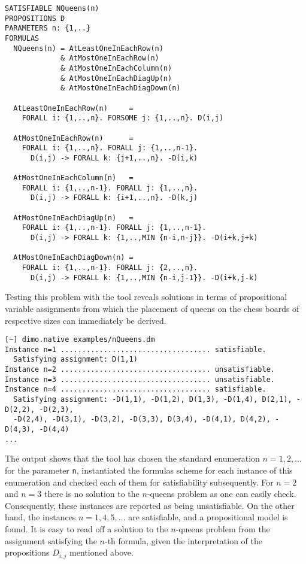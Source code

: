 \documentclass[twoside]{article}
\begin{document}
\begin{verbatim}
SATISFIABLE NQueens(n)
PROPOSITIONS D
PARAMETERS n: {1,..}
FORMULAS 
  NQueens(n) = AtLeastOneInEachRow(n)
             & AtMostOneInEachRow(n)
             & AtMostOneInEachColumn(n)
             & AtMostOneInEachDiagUp(n)
             & AtMostOneInEachDiagDown(n)
	         
  AtLeastOneInEachRow(n)     = 
    FORALL i: {1,..,n}. FORSOME j: {1,..,n}. D(i,j)
    
  AtMostOneInEachRow(n)      = 
    FORALL i: {1,..,n}. FORALL j: {1,..,n-1}. 
      D(i,j) -> FORALL k: {j+1,..,n}. -D(i,k)
    
  AtMostOneInEachColumn(n)   = 
    FORALL i: {1,..,n-1}. FORALL j: {1,..,n}. 
      D(i,j) -> FORALL k: {i+1,..,n}. -D(k,j)
    
  AtMostOneInEachDiagUp(n)   = 
    FORALL i: {1,..,n-1}. FORALL j: {1,..,n-1}. 
      D(i,j) -> FORALL k: {1,..,MIN {n-i,n-j}}. -D(i+k,j+k)
    
  AtMostOneInEachDiagDown(n) = 
    FORALL i: {1,..,n-1}. FORALL j: {2,..,n}. 
      D(i,j) -> FORALL k: {1,..,MIN {n-i,j-1}}. -D(i+k,j-k)
\end{verbatim}
Testing this problem with the \DiMo tool reveals solutions in terms of propositional variable assignments from which the placement of queens on the 
chess boards of respective sizes can immediately be derived.
\begin{verbatim}
[~] dimo.native examples/nQueens.dm
Instance n=1 ................................... satisfiable.
  Satisfying assignment: D(1,1)
Instance n=2 ................................... unsatisfiable.
Instance n=3 ................................... unsatisfiable.
Instance n=4 ................................... satisfiable.
  Satisfying assignment: -D(1,1), -D(1,2), D(1,3), -D(1,4), D(2,1), -D(2,2), -D(2,3), 
  -D(2,4), -D(3,1), -D(3,2), -D(3,3), D(3,4), -D(4,1), D(4,2), -D(4,3), -D(4,4)
...
\end{verbatim} 
The output shows that the \DiMo tool has chosen the standard enumeration $n = 1,2,\ldots$ for the parameter \texttt{n}, instantiated the formulas scheme for
each instance of this enumeration and checked each of them for satisfiability subsequently. For $n = 2$ and $n = 3$ there is no solution to the $n$-queens
problem as one can easily check. Consequently, these instances are reported as being unsatisfiable. On the other hand, the instances $n=1,4,5,\ldots$ are
satisfiable, and a propositional model is found. It is easy to read off a solution to the $n$-queens problem from the assignment satisfying the $n$-th formula,
given the interpretation of the propositions $D_{i,j}$ mentioned above.
\end{document}
